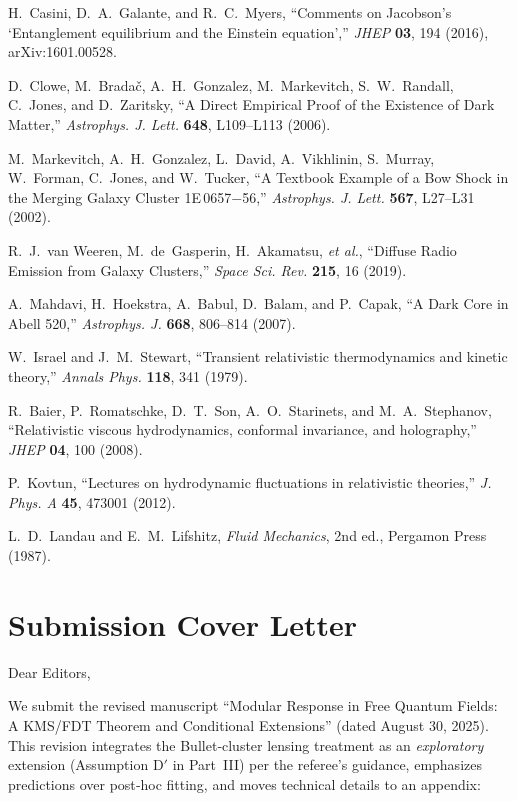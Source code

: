 \documentclass[aps,prd,onecolumn,superscriptaddress,nofootinbib]{revtex4-2}
\begin{document}
\begin{thebibliography}{99}
H.~Casini, D.~A.~Galante, and R.~C.~Myers,
``Comments on Jacobson's `Entanglement equilibrium and the Einstein equation',''
\emph{JHEP} \textbf{03}, 194 (2016), arXiv:1601.00528.

D.~Clowe, M.~Brada\v{c}, A.~H.~Gonzalez, M.~Markevitch, S.~W.~Randall, C.~Jones, and D.~Zaritsky,
``A Direct Empirical Proof of the Existence of Dark Matter,''
\emph{Astrophys. J. Lett.} \textbf{648}, L109–L113 (2006).

M.~Markevitch, A.~H.~Gonzalez, L.~David, A.~Vikhlinin, S.~Murray, W.~Forman, C.~Jones, and W.~Tucker,
``A Textbook Example of a Bow Shock in the Merging Galaxy Cluster 1E\,0657$-$56,''
\emph{Astrophys. J. Lett.} \textbf{567}, L27–L31 (2002).

R.~J.~van Weeren, M.~de~Gasperin, H.~Akamatsu, \emph{et al.},
``Diffuse Radio Emission from Galaxy Clusters,''
\emph{Space Sci. Rev.} \textbf{215}, 16 (2019).

A.~Mahdavi, H.~Hoekstra, A.~Babul, D.~Balam, and P.~Capak,
``A Dark Core in Abell 520,''
\emph{Astrophys. J.} \textbf{668}, 806–814 (2007).

W.~Israel and J.~M.~Stewart,
``Transient relativistic thermodynamics and kinetic theory,''
\emph{Annals Phys.} \textbf{118}, 341 (1979).

R.~Baier, P.~Romatschke, D.~T.~Son, A.~O.~Starinets, and M.~A.~Stephanov,
``Relativistic viscous hydrodynamics, conformal invariance, and holography,''
\emph{JHEP} \textbf{04}, 100 (2008).

P.~Kovtun,
``Lectures on hydrodynamic fluctuations in relativistic theories,''
\emph{J. Phys. A} \textbf{45}, 473001 (2012).

L.~D.~Landau and E.~M.~Lifshitz,
\emph{Fluid Mechanics}, 2nd ed., Pergamon Press (1987).

\end{thebibliography}

\iffalse
\section*{Submission Cover Letter}
Dear Editors,

We submit the revised manuscript “Modular Response in Free Quantum Fields: A KMS/FDT Theorem and Conditional Extensions” (dated August 30, 2025). This revision integrates the Bullet‑cluster lensing treatment as an \emph{exploratory} extension (Assumption D$'$ in Part~III) per the referee’s guidance, emphasizes predictions over post‑hoc fitting, and moves technical details to an appendix:
\end{document}
